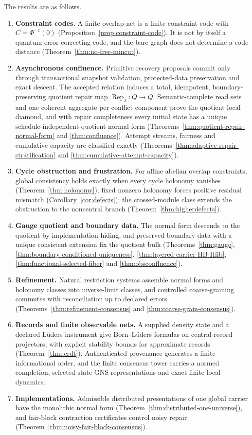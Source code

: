 \documentclass[11pt]{article}
\theoremstyle{remark}
\theoremstyle{plain}
\begin{document}
The results are as follows.
\begin{enumerate}[leftmargin=2em]
\item \textbf{Constraint codes.} A finite overlap net is a finite
constraint code with \(C=\Phi^{-1}(0)\)
(Proposition~\ref{prop:constraint-code}). It is not by itself a quantum
error-correcting code, and the bare graph does not determine a code
distance (Theorem~\ref{thm:no-free-mincut}).
\item \textbf{Asynchronous confluence.} Primitive recovery proposals commit
only through transactional snapshot validation, protected-data
preservation and exact descent. The accepted relation induces a total,
idempotent, boundary-preserving quotient repair map
\(\operatorname{Rep}_\lambda:Q\to Q\). Semantic-complete read sets and one
coherent aggregate per conflict component prove the quotient local diamond,
and with repair completeness every initial state has a unique
schedule-independent quotient normal form
(Theorems~\ref{thm:quotient-repair-normal-form} and \ref{thm:confluence}).
Attempt streams, fairness and cumulative capacity are classified exactly
(Theorems~\ref{thm:adaptive-repair-stratification} and
\ref{thm:cumulative-attempt-capacity}).
\item \textbf{Cycle obstruction and frustration.} For affine abelian overlap
constraints, global consistency holds exactly when every cycle holonomy
vanishes (Theorem~\ref{thm:holonomy}); fixed nonzero holonomy forces
positive residual mismatch (Corollary~\ref{cor:defects}); the
crossed-module class extends the obstruction to the noncentral branch
(Theorem~\ref{thm:higherdefects}).
\item \textbf{Gauge quotient and boundary data.} The normal form descends to
the quotient by implementation hiding, and preserved boundary data with a
unique consistent extension fix the quotient bulk
(Theorems~\ref{thm:gauge}, \ref{thm:boundary-conditioned-uniqueness},
\ref{thm:layered-carrier-HB-Hfib}, \ref{thm:functional-selected-fiber} and
\ref{thm:obsconfluence}).
\item \textbf{Refinement.} Natural restriction systems assemble normal forms
and holonomy classes into inverse-limit classes, and controlled
coarse-graining commutes with reconciliation up to declared errors
(Theorems~\ref{thm:refinement-consensus} and
\ref{thm:coarse-grain-consensus}).
\item \textbf{Records and finite observable nets.} A supplied density state
and a declared L\"uders instrument give Born--L\"uders formulas on central
record projectors, with explicit stability bounds for approximate records
(Theorem~\ref{thm:crdt}). Authenticated provenance generates a finite
informational order, and the finite consensus tower carries a normed
completion, selected-state GNS representations and exact finite local
dynamics.
\item \textbf{Implementations.} Admissible distributed presentations of one
global carrier have the monolithic normal form
(Theorem~\ref{thm:distributed-one-universe}), and fair-block contraction
certificates control noisy repair
(Theorem~\ref{thm:noisy-fair-block-consensus}).
\end{enumerate}
\end{document}
